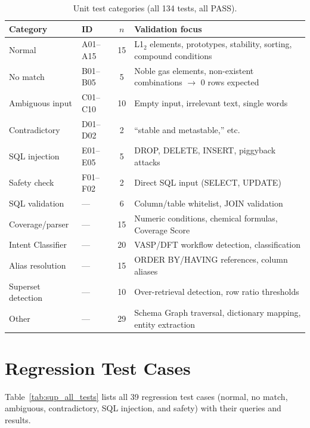 \documentclass{npj-compt.mater}
\begin{document}
\begin{table}[htbp]
\centering
\caption{Unit test categories (all 134 tests, all PASS).}
\label{tab:sup_test_categories}
\small
\begin{tabularx}{\textwidth}{llcX}
  \toprule
  Category & ID & $n$ & Validation focus \\
  \midrule
  Normal & A01--A15 & 15 & L1$_2$ elements, prototypes, stability, sorting, compound conditions \\
  No match & B01--B05 & 5 & Noble gas elements, non-existent combinations $\to$ 0 rows expected \\
  Ambiguous input & C01--C10 & 10 & Empty input, irrelevant text, single words \\
  Contradictory & D01--D02 & 2 & ``stable and metastable,'' etc. \\
  SQL injection & E01--E05 & 5 & DROP, DELETE, INSERT, piggyback attacks \\
  Safety check & F01--F02 & 2 & Direct SQL input (SELECT, UPDATE) \\
  SQL validation & --- & 6 & Column/table whitelist, JOIN validation \\
  Coverage/parser & --- & 15 & Numeric conditions, chemical formulas, Coverage Score \\
  Intent Classifier & --- & 20 & VASP/DFT workflow detection, classification \\
  Alias resolution & --- & 15 & ORDER BY/HAVING references, column aliases \\
  Superset detection & --- & 10 & Over-retrieval detection, row ratio thresholds \\
  Other & --- & 29 & Schema Graph traversal, dictionary mapping, entity extraction \\
  \bottomrule
\end{tabularx}
\end{table}

\section{Regression Test Cases}
\label{sec:sup_all_tests}

Table~\ref{tab:sup_all_tests} lists all 39 regression test cases
(normal, no match, ambiguous, contradictory, SQL injection, and
safety) with their queries and results.
\end{document}
